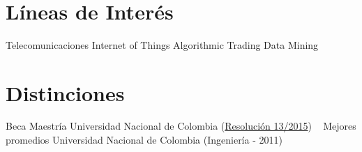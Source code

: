 \documentclass[11pt]{friggeri-cv} %
\begin{document}
\begin{aside2}
~
\section{Líneas de Interés}
Telecomunicaciones
Internet of Things 
Algorithmic Trading
Data Mining
~
\section{Distinciones}
{\color{black}\faTrophy} Beca Maestría
Universidad Nacional
de Colombia (\href{https://www.ingenieria.bogota.unal.edu.co/facultad/consejo-de-facultad/actas-casos-estudiantiles/category/265-2015.html?download=1777:acta-consejo-facultad-013-2015-08-13}{Resolución 13/2015})
~
{\color{black}\faTrophy} Mejores promedios
Universidad Nacional
de Colombia (Ingeniería - 2011)
\end{aside2}
\end{document}
